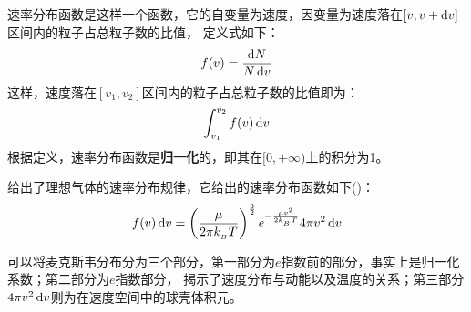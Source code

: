         \subsection[麦克斯韦分布]{}
            速率分布函数是这样一个函数，它的自变量为速度，因变量为速度落在$[v,v+\dif{v}]$区间内的粒子占总粒子数的比值，
            定义式如下：
            \begin{equation}
                f(v) = \frac{\dif{N}}{N\dif{v}}
                \nonumber
            \end{equation}
            这样，速度落在$[v_{1},v_{2}]$区间内的粒子占总粒子数的比值即为：
            \begin{equation}
                \int_{v_{1}}^{v_{2}} f(v)\dif{v}
                \nonumber
            \end{equation}
            根据定义，速率分布函数是\textbf{归一化}的，即其在$[0,+\infty)$上的积分为1。
                
            给出了理想气体的速率分布规律，它给出的速率分布函数如下()：
            \begin{equation}
                f(v)\dif{v}=\left(\dfrac \mu{2\pi k_{_B}T}\right)^{\frac{3}{2}}e^{-\frac{\mu v^{2}}{2k_{_B}T}}4\pi v^2\dif{v}
                \nonumber
            \end{equation}
            
            可以将麦克斯韦分布分为三个部分，第一部分为$e$指数前的部分，事实上是归一化系数；第二部分为$e$指数部分，
            揭示了速度分布与动能以及温度的关系；第三部分$4\pi v^{2}\dif{v}$则为在速度空间中的球壳体积元。

